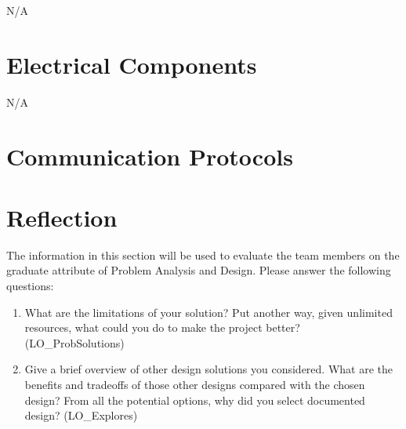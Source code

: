 \documentclass[12pt, titlepage]{article}
\begin{document}
N/A

\section{Electrical Components}

N/A

\section{Communication Protocols}

\section{Reflection}

The information in this section will be used to evaluate the team members on the
graduate attribute of Problem Analysis and Design.  Please answer the following questions:

\begin{enumerate}
  \item What are the limitations of your solution?  Put another way, given
  unlimited resources, what could you do to make the project better? (LO\_ProbSolutions)
  \item Give a brief overview of other design solutions you considered.  What
  are the benefits and tradeoffs of those other designs compared with the chosen
  design?  From all the potential options, why did you select documented design?
  (LO\_Explores)
\end{enumerate}
\end{document}

